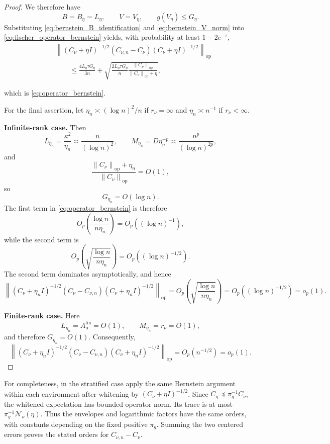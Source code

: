 \documentclass[11pt]{article}
\newcommand{\Ncal}{\mathcal{N}}
\newcommand{\op}{\mathrm{op}}
\newcommand{\norm}[1]{\left\lVert #1\right\rVert}
\begin{document}
\begin{proof}
We therefore have
\[
    B=B_\eta
    =
    L_\eta,
    \qquad
    V=V_\eta^{},
    \qquad
    g(V_\eta^{})\leq G_\eta.
\]
Substituting \eqref{eq:bernstein_B_identification} and
\eqref{eq:bernstein_V_norm} into
\eqref{eq:fischer_operator_bernstein} yields, with probability at least
$1-2e^{-\tau}$,
\begin{align*}
  &\norm{
    (C_\nu+\eta I)^{-1/2}
    (C_{\nu,n} - C_\nu)
    (C_\nu+\eta I)^{-1/2}
  }_{\op}
  \\
  &\qquad\leq
  \frac{4L_\eta\tau G_\eta}{3n}
  +
  \sqrt{
    \frac{2L_\eta\tau G_\eta}{n}
    \frac{\norm{C_\nu}_{\op}}
         {\norm{C_\nu}_{\op}+\eta}
  },
\end{align*}

which is \eqref{eq:operator_bernstein}.

For the final assertion, let $\eta_n\asymp (\log n)^2/n$ if $r_\nu=\infty$ and $\eta_n\asymp n^{-1}$ if $r_\nu<\infty$.

\medskip
\noindent\textbf{Infinite-rank case.}
Then
\[
  L_{\eta_n}=\frac{\kappa^2}{\eta_n}
  \asymp \frac{n}{(\log n)^2},
  \qquad
  M_{\eta_n}=D\eta_n^{-p}\asymp \frac{n^p}{(\log n)^{2p}},
\]
and
\[
  \frac{\norm{C_\nu}_{\op}+\eta_n}{\norm{C_\nu}_{\op}}
  =O(1),
\]
so
\[
  G_{\eta_n}=O(\log n).
\]
The first term in \eqref{eq:operator_bernstein} is therefore
\[
  O_p\!\left(\frac{\log n}{n\eta_n}\right)
  =O_p\!\left((\log n)^{-1}\right),
\]
while the second term is
\[
  O_p\!\left(
  \sqrt{\frac{\log n}{n\eta_n}}
  \right)
  =O_p\!\left((\log n)^{-1/2}\right).
\]
The second term dominates asymptotically, and hence
\[
  \norm{
    (C_\nu+\eta_n I)^{-1/2}
    (C_\nu-C_{\nu,n})
    (C_\nu+\eta_n I)^{-1/2}
  }_{\op}
  =
  O_p\!\left(
    \sqrt{\frac{\log n}{n\eta_n}}
  \right)
  =O_p\!\left((\log n)^{-1/2}\right)
  =o_p(1).
\]

\medskip
\noindent\textbf{Finite-rank case.}
Here
\[
  L_{\eta_n}=A_{\mathrm u}^{\mathrm{fin}}=O(1),
  \qquad
  M_{\eta_n}=r_\nu=O(1),
\]
and therefore $G_{\eta_n}=O(1)$. Consequently,
\[
  \norm{
    (C_\nu+\eta_n I)^{-1/2}
    (C_\nu-C_{\nu,n})
    (C_\nu+\eta_n I)^{-1/2}
  }_{\op}
  =
  O_p(n^{-1/2})
  =o_p(1).
\]
\end{proof}




For completeness, in the stratified case apply the same Bernstein argument within each environment after whitening by $(C_\nu+\eta I)^{-1/2}$. Since $C_g\preceq\pi_g^{-1}C_\nu$, the whitened expectation has bounded operator norm. Its trace is at most $\pi_g^{-1}\Ncal_\nu(\eta)$. Thus the envelopes and logarithmic factors have the same orders, with constants depending on the fixed positive $\pi_g$. Summing the two centered errors proves the stated orders for $C_{\nu,n}-C_\nu$.
\end{document}
